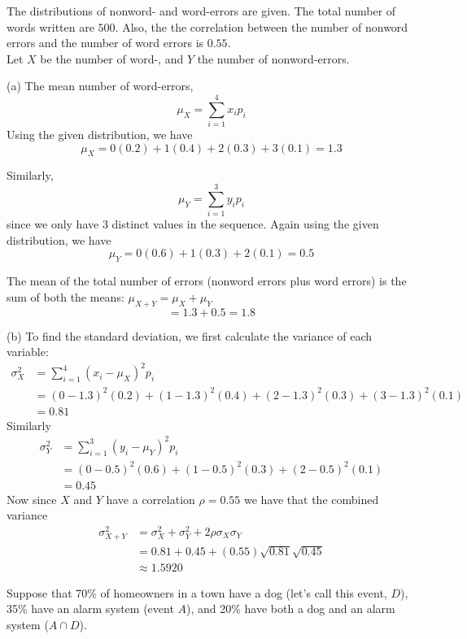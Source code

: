 \documentclass[boxes, qed]{homework}
\begin{document}
\begin{problem}The distributions of nonword- and word-errors are given. 
  The total number of words written are $500$. Also, the 
  the correlation between the number of nonword errors and the number 
  of word errors is $0.55$.\\
  Let $X$ be the number of word-, and $Y$
  the number of nonword-errors.
\end{problem}
\begin{solution}(a) The mean number of word-errors,
  $$\mu_X = \sum_{i=1}^{4}{x_ip_i}$$
  Using the given distribution, we have
  $$\mu_X = 0(0.2) + 1(0.4) + 2(0.3) + 3(0.1) = 1.3$$
  
  Similarly,
  $$\mu_Y = \sum_{i=1}^{3}{y_ip_i}$$
  since we only have 3 distinct values
  in the sequence. Again using the given distribution, we have
  $$\mu_Y = 0(0.6) + 1(0.3) + 2(0.1) = 0.5$$
  
  The mean of the total number of errors 
  (nonword errors plus word errors) is the sum
  of both the means: $\mu_{X+Y} = \mu_X + \mu_Y$
  $$=1.3+0.5 = \boxed{1.8}$$

  (b) To find the standard deviation, we first calculate
  the variance of each variable:
  \begin{align*}
    \sigma_{X}^2 &= \sum_{i=1}^4{(x_i-\mu_X)^2p_i}\\
    &= (0-1.3)^2(0.2)
      + (1-1.3)^2(0.4)
      + (2-1.3)^2(0.3)
      + (3-1.3)^2(0.1)\\
    &= 0.81
  \end{align*}
  Similarly
  \begin{align*}
    \sigma_{Y}^2 &= \sum_{i=1}^3{(y_i-\mu_Y)^2p_i}\\
    &= (0-0.5)^2(0.6)
      + (1-0.5)^2(0.3)
      + (2-0.5)^2(0.1)\\
    &= 0.45
  \end{align*}
  Now since $X$ and $Y$ have a correlation
  $\rho=0.55$ we have that the combined variance
  \begin{align*}
    \sigma_{X+Y}^2 
      &= \sigma_X^2 + \sigma_Y^2 + 2\rho\sigma_X\sigma_Y\\
      &= 0.81 + 0.45 + (0.55)\sqrt{0.81}\sqrt{0.45}\\
      &\boxed{\approx 1.5920}
  \end{align*}
\end{solution}
\begin{problem}Suppose that 70\% of homeowners in a town have a dog
  (let's call this event, $D$), 
  35\% have an alarm system (event $A$), and
  20\% have both a dog and an alarm system ($A\cap{D}$).
\end{problem}
\end{document}
